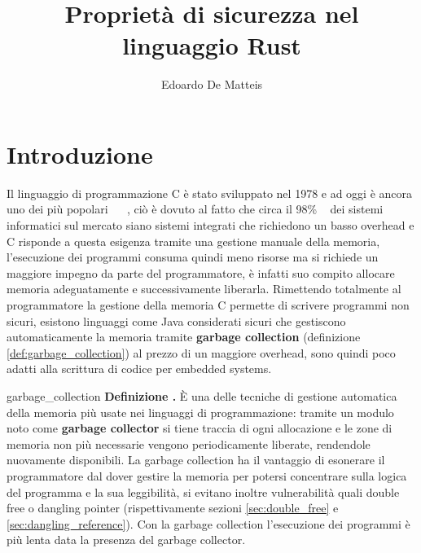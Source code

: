 \documentclass[Lau,binding=0.6cm]{sapthesis}
\title{Proprietà di sicurezza nel linguaggio Rust}
\author{Edoardo De Matteis}
\newenvironment{myDefinition}[2]{ \begin{Definizione}[adjusted title=#1]{}{#2}
    \textbf{Definizione \thetcbcounter.} }{\end{Definizione}}
\begin{document}
\frontmatter

\maketitle




\tableofcontents


\mainmatter

\chapter{Introduzione}

Il linguaggio di programmazione C è stato sviluppato nel 1978 e ad oggi è ancora uno dei più popolari ~\cite{tiobe:index} ~\cite{pypl:index}, ciò è dovuto al fatto che circa il 98\% ~\cite{real_men_program_in_c} dei sistemi informatici sul mercato siano sistemi integrati che richiedono un basso overhead e C risponde a questa esigenza tramite una gestione manuale della memoria, l'esecuzione dei programmi consuma quindi meno risorse ma si richiede un maggiore impegno da parte del programmatore, è infatti suo compito allocare memoria adeguatamente e successivamente liberarla. 
Rimettendo totalmente al programmatore la gestione della memoria C permette di scrivere programmi non sicuri, esistono linguaggi come Java considerati sicuri che gestiscono automaticamente la memoria tramite \textbf{garbage collection} (definizione \ref{def:garbage_collection}) al prezzo di un maggiore overhead, sono quindi poco adatti alla scrittura di codice per embedded systems.

\begin{myDefinition}{Garbage collection}{garbage_collection}
    È una delle tecniche di gestione automatica della memoria più usate nei linguaggi di programmazione: tramite un modulo noto come \textbf{garbage collector} si tiene traccia di ogni allocazione e le zone di memoria non più necessarie vengono periodicamente liberate, rendendole nuovamente disponibili. 
    La garbage collection ha il vantaggio di esonerare il programmatore dal dover gestire la memoria per potersi concentrare sulla logica del programma e la sua leggibilità, si evitano inoltre vulnerabilità quali double free o dangling pointer (rispettivamente sezioni \ref{sec:double_free} e \ref{sec:dangling_reference}). 
    Con la garbage collection l'esecuzione dei programmi è più lenta data la presenza del garbage collector.
\end{myDefinition}
\end{document}

